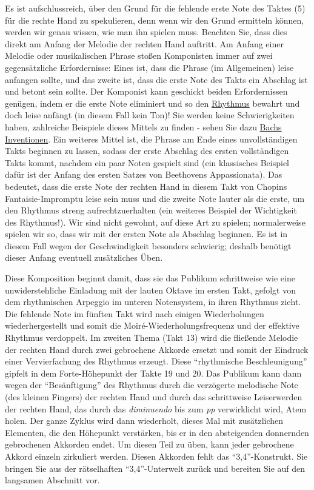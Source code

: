 Es ist aufschlussreich, über den Grund für die fehlende erste Note des Taktes (5) für die rechte Hand zu spekulieren, denn wenn wir den Grund ermitteln können, werden wir genau wissen, wie man ihn spielen muss.
Beachten Sie, dass dies direkt am Anfang der Melodie der rechten Hand auftritt.
Am Anfang einer Melodie oder musikalischen Phrase stoßen Komponisten immer auf zwei gegensätzliche Erfordernisse: Eines ist, dass die Phrase (im Allgemeinen) leise anfangen sollte, und das zweite ist, dass die erste Note des Takts ein Abschlag ist und betont sein sollte.
Der Komponist kann geschickt beiden Erfordernissen genügen, indem er die erste Note eliminiert und so den \hyperlink{c1iii1b}{Rhythmus} bewahrt und doch leise anfängt (in diesem Fall kein Ton)!
Sie werden keine Schwierigkeiten haben, zahlreiche Beispiele dieses Mittels zu finden - sehen Sie dazu \hyperlink{c1iii20}{Bachs Inventionen}.
Ein weiteres Mittel ist, die Phrase am Ende eines unvollständigen Takts beginnen zu lassen, sodass der erste Abschlag des ersten vollständigen Takts kommt, nachdem ein paar Noten gespielt sind (ein klassisches Beispiel dafür ist der Anfang des ersten Satzes von Beethovens Appassionata).
Das bedeutet, dass die erste Note der rechten Hand in diesem Takt von Chopins Fantaisie-Impromptu leise sein muss und die zweite Note lauter als die erste, um den Rhythmus streng aufrechtzuerhalten (ein weiteres Beispiel der Wichtigkeit des Rhythmus!).
Wir sind nicht gewohnt, auf diese Art zu spielen; normalerweise spielen wir so, dass wir mit der ersten Note als Abschlag beginnen.
Es ist in diesem Fall wegen der Geschwindigkeit besonders schwierig; deshalb benötigt dieser Anfang eventuell zusätzliches Üben.

Diese Komposition beginnt damit, dass sie das Publikum schrittweise wie eine unwiderstehliche Einladung mit der lauten Oktave im ersten Takt, gefolgt von dem rhythmischen Arpeggio im unteren Notensystem, in ihren Rhythmus zieht.
Die fehlende Note im fünften Takt wird nach einigen Wiederholungen wiederhergestellt und somit die Moiré-Wiederholungsfrequenz und der effektive Rhythmus verdoppelt.
Im zweiten Thema (Takt 13) wird die fließende Melodie der rechten Hand durch zwei gebrochene Akkorde ersetzt und somit der Eindruck einer Vervierfachung des Rhythmus erzeugt.
Diese \enquote{rhythmische Beschleunigung} gipfelt in dem Forte-Höhepunkt der Takte 19 und 20.
Das Publikum kann dann wegen der \enquote{Besänftigung} des Rhythmus durch die verzögerte melodische Note (des kleinen Fingers) der rechten Hand und durch das schrittweise Leiserwerden der rechten Hand, das durch das \textit{diminuendo} bis zum \textit{pp} verwirklicht wird, Atem holen.
Der ganze Zyklus wird dann wiederholt, dieses Mal mit zusätzlichen Elementen, die den Höhepunkt verstärken, bis er in den absteigenden donnernden gebrochenen Akkorden endet.
Um diesen Teil zu üben, kann jeder gebrochene Akkord einzeln zirkuliert werden.
Diesen Akkorden fehlt das \enquote{3,4}-Konstrukt. Sie bringen Sie aus der rätselhaften \enquote{3,4}-Unterwelt zurück und bereiten Sie auf den langsamen Abschnitt vor.

